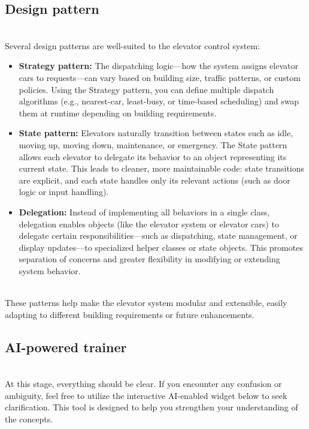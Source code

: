 \subsection{Design pattern}\label{DOwu3M73j1ZgdpKzHFk7D}
\\
Several design patterns are well-suited to the elevator control system:

\begin{itemize}
\item
\protect{}\label{Jj5jYodB1oTT7kJrDX2ZU}
\textbf{Strategy pattern:} The dispatching logic---how the system assigns elevator cars to requests---can vary based on building size, traffic patterns, or custom policies. Using the Strategy pattern, you can define multiple dispatch algorithms (e.g., nearest-car, least-busy, or time-based scheduling) and swap them at runtime depending on building requirements.
\item
\protect{}\label{GVL2rTQeHPP6sljdsatfD}
\textbf{State pattern:} Elevators naturally transition between states such as idle, moving up, moving down, maintenance, or emergency. The State pattern allows each elevator to delegate its behavior to an object representing its current state. This leads to cleaner, more maintainable code: state transitions are explicit, and each state handles only its relevant actions (such as door logic or input handling).
\item
\protect{}\label{tJ-6-aY3xNPspRkrH485I}
\textbf{Delegation:} Instead of implementing all behaviors in a single class, delegation enables objects (like the elevator system or elevator cars) to delegate certain responsibilities---such as dispatching, state management, or display updates---to specialized helper classes or state objects. This promotes separation of concerns and greater flexibility in modifying or extending system behavior.
\end{itemize}
\\
These patterns help make the elevator system modular and extensible, easily adapting to different building requirements or future enhancements.

\subsection{AI-powered trainer}\label{FQLkrluSPM3UYoJmrdCuE}
\\
At this stage, everything should be clear. If you encounter any confusion or ambiguity, feel free to utilize the interactive AI-enabled widget below to seek clarification. This tool is designed to help you strengthen your understanding of the concepts.

